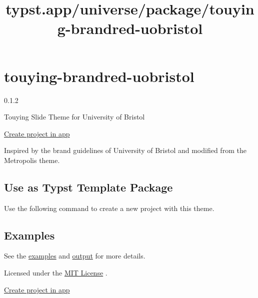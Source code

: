 \title{typst.app/universe/package/touying-brandred-uobristol}

\label{banner}
\label{template-thumbnail}

\section{touying-brandred-uobristol}\label{touying-brandred-uobristol}

{ 0.1.2 }

Touying Slide Theme for University of Bristol

\href{/app?template=touying-brandred-uobristol&version=0.1.2}{Create
project in app}

\label{readme}
Inspired by the brand guidelines of University of Bristol and modified
from the Metropolis theme.

\subsection{Use as Typst Template
Package}\label{use-as-typst-template-package}

Use the following command to create a new project with this theme.

\begin{Shaded}
\begin{Highlighting}[]
\end{Highlighting}
\end{Shaded}

\subsection{Examples}\label{examples}

See the
\href{https://github.com/typst/packages/raw/main/packages/preview/touying-brandred-uobristol/0.1.2/examples/example.typ}{examples}
and
\href{https://github.com/typst/packages/raw/main/packages/preview/touying-brandred-uobristol/0.1.2/examples/example.pdf}{output}
for more details.

Licensed under the
\href{https://github.com/typst/packages/raw/main/packages/preview/touying-brandred-uobristol/0.1.2/LICENSE}{MIT
License} .

\href{/app?template=touying-brandred-uobristol&version=0.1.2}{Create
project in app}

